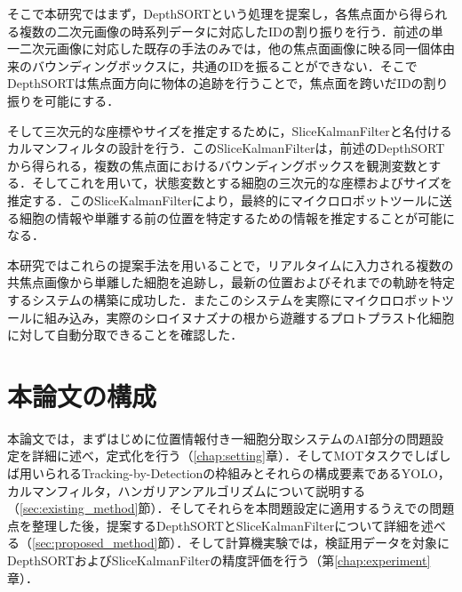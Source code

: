 そこで本研究ではまず，DepthSORTという処理を提案し，各焦点面から得られる複数の二次元画像の時系列データに対応したIDの割り振りを行う．前述の単一二次元画像に対応した既存の手法のみでは，他の焦点面画像に映る同一個体由来のバウンディングボックスに，共通のIDを振ることができない．そこでDepthSORTは焦点面方向に物体の追跡を行うことで，焦点面を跨いだIDの割り振りを可能にする．

そして三次元的な座標やサイズを推定するために，SliceKalmanFilterと名付けるカルマンフィルタの設計を行う．このSliceKalmanFilterは，前述のDepthSORTから得られる，複数の焦点面におけるバウンディングボックスを観測変数とする．そしてこれを用いて，状態変数とする細胞の三次元的な座標およびサイズを推定する．このSliceKalmanFilterにより，最終的にマイクロロボットツールに送る細胞の情報や単離する前の位置を特定するための情報を推定することが可能になる．

本研究ではこれらの提案手法を用いることで，リアルタイムに入力される複数の共焦点画像から単離した細胞を追跡し，最新の位置およびそれまでの軌跡を特定するシステムの構築に成功した．またこのシステムを実際にマイクロロボットツールに組み込み，実際のシロイヌナズナの根から遊離するプロトプラスト化細胞に対して自動分取できることを確認した．

\section{本論文の構成}
\label{sec:outline}

本論文では，まずはじめに位置情報付き一細胞分取システムのAI部分の問題設定を詳細に述べ，定式化を行う（\ref{chap:setting}章）．そしてMOTタスクでしばしば用いられるTracking-by-Detectionの枠組みとそれらの構成要素であるYOLO，カルマンフィルタ，ハンガリアンアルゴリズムについて説明する（\ref{sec:existing_method}節）．そしてそれらを本問題設定に適用するうえでの問題点を整理した後，提案するDepthSORTとSliceKalmanFilterについて詳細を述べる（\ref{sec:proposed_method}節）．そして計算機実験では，検証用データを対象にDepthSORTおよびSliceKalmanFilterの精度評価を行う（第\ref{chap:experiment}章）．